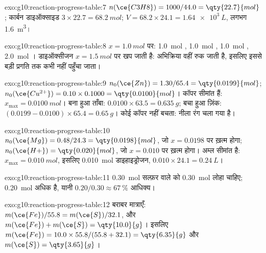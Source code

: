 \begin{solution}{exo:g10:reaction-progress-table:7}
$n(\ce{C3H8}) = 1000 / 44.0 = \qty{22.7}{mol}$; कार्बन डाइऑक्साइड
$3 \times 22.7 = \qty{68.2}{mol}$; $V = 68.2 \times 24.1 =
\qty{1.64e3}{L}$, लगभग \qty{1.6}{m^3}।
\end{solution}

\begin{solution}{exo:g10:reaction-progress-table:8}
$x = \qty{1.0}{mol}$ पर: \qty{1.0}{mol} , \qty{1.0}{mol}
, \qty{1.0}{mol} , \qty{2.0}{mol} । डाइऑक्सीजन
$x = \qty{1.5}{mol}$ पर खप जाती है: अभिक्रिया वहीं रुक जाती है, इसलिए इससे बड़ी
प्रगति तक कभी नहीं पहुँचा जाता।
\end{solution}

\begin{solution}{exo:g10:reaction-progress-table:9}
$n_0(\ce{Zn}) = 1.30 / 65.4 = \qty{0.0199}{mol}$;
$n_0(\ce{Cu^{2+}}) = 0.10 \times 0.1000 = \qty{0.0100}{mol}$। कॉपर
 सीमांत हैं: $x_{\max} = \qty{0.0100}{mol}$। बना हुआ ताँबा:
$0.0100 \times 63.5 = \qty{0.635}{g}$; बचा हुआ ज़िंक:
$(0.0199 - 0.0100) \times 65.4 = \qty{0.65}{g}$। कोई कॉपर  नहीं बचता:
नीला रंग चला गया है।
\end{solution}

\begin{solution}{exo:g10:reaction-progress-table:10}
$n_0(\ce{Mg}) = 0.48 / 24.3 = \qty{0.0198}{mol}$, जो
$x = 0.0198$ पर ख़त्म होगा; $n_0(\ce{H+}) = \qty{0.020}{mol}$, जो
$x = 0.010$ पर ख़त्म होगा। अम्ल सीमांत है: $x_{\max} = \qty{0.010}{mol}$, इसलिए
\qty{0.010}{mol} डाइहाइड्रोजन, $0.010 \times 24.1 = \qty{0.24}{L}$।
\end{solution}

\begin{solution}{exo:g10:reaction-progress-table:11}
\qty{0.30}{mol} सल्फ़र वाले  को \qty{0.30}{mol} लोहा
चाहिए; \qty{0.20}{mol} अधिक है, यानी
$0.20 / 0.30 \approx \qty{67}{\percent}$ आधिक्य।
\end{solution}

\begin{solution}{exo:g10:reaction-progress-table:12}
बराबर मात्राएँ: $m(\ce{Fe})/55.8 = m(\ce{S})/32.1$, और
$m(\ce{Fe}) + m(\ce{S}) = \qty{10.0}{g}$। इसलिए
$m(\ce{Fe}) = 10.0 \times 55.8 / (55.8 + 32.1) = \qty{6.35}{g}$ और
$m(\ce{S}) = \qty{3.65}{g}$।
\end{solution}

